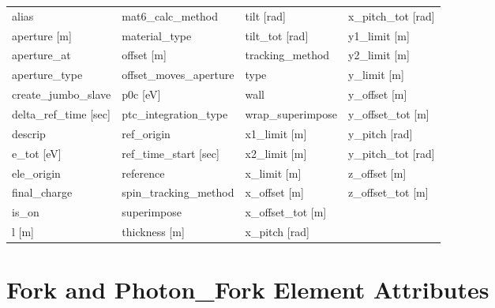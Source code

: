  \begin{tabular}{llll} \toprule
alias                            & mat6_calc_method                 & tilt [rad]                       & x_pitch_tot [rad]                \\
aperture [m]                     & material_type                    & tilt_tot [rad]                   & y1_limit [m]                     \\
aperture_at                      & offset [m]                       & tracking_method                  & y2_limit [m]                     \\
aperture_type                    & offset_moves_aperture            & type                             & y_limit [m]                      \\
create_jumbo_slave               & p0c [eV]                         & wall                             & y_offset [m]                     \\
delta_ref_time [sec]             & ptc_integration_type             & wrap_superimpose                 & y_offset_tot [m]                 \\
descrip                          & ref_origin                       & x1_limit [m]                     & y_pitch [rad]                    \\
e_tot [eV]                       & ref_time_start [sec]             & x2_limit [m]                     & y_pitch_tot [rad]                \\
ele_origin                       & reference                        & x_limit [m]                      & z_offset [m]                     \\
final_charge                     & spin_tracking_method             & x_offset [m]                     & z_offset_tot [m]                 \\
is_on                            & superimpose                      & x_offset_tot [m]                 &                                  \\
l [m]                            & thickness [m]                    & x_pitch [rad]                    &                                  \\
 \bottomrule
 \end{tabular}
 \vfill
 
 \section{Fork and Photon_Fork Element Attributes}
 \label{s:list.fork}
 
